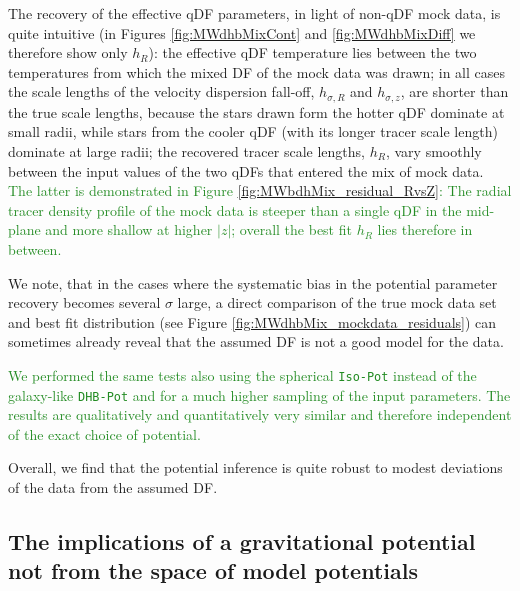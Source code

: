 \documentclass[iop,revtex4]{emulateapj}
\newcommand{\NEW}[1]{\textcolor{ForestGreen}{#1}}
\newcommand{\OLD}[1]{}
\begin{document}
The recovery of the effective qDF parameters, in light of non-qDF mock data, is quite intuitive (in Figures \ref{fig:MWdhbMixCont} and \ref{fig:MWdhbMixDiff} we therefore show only $h_R$): the effective qDF temperature lies between the two temperatures from which the mixed DF of the mock data was drawn; in all cases the scale lengths of the velocity dispersion fall-off, $h_{\sigma,R}$ and $h_{\sigma,z}$, are shorter than the true scale lengths, because the stars drawn form the hotter qDF dominate at small radii, while stars from the cooler qDF (with its longer tracer scale length) dominate at large radii; the recovered tracer scale lengths, $h_R$, vary smoothly between the input values of the two qDFs that entered the mix of mock data\OLD{, with again the impact of contamination by a hotter qDF (with its shorter scale length in this case) being more important}. \NEW{The latter is demonstrated in Figure \ref{fig:MWbdhMix_residual_RvsZ}: The radial tracer density profile of the mock data is steeper than a single qDF in the mid-plane and more shallow at higher $|z|$; overall the best fit $h_R$ lies therefore in between.}

We note, that in the cases where the systematic bias in the potential parameter recovery becomes several $\sigma$ large, a direct comparison of the true mock data set and best fit distribution (see Figure \ref{fig:MWdhbMix_mockdata_residuals}) can sometimes already reveal that the assumed DF is not a good model for the data.

\NEW{We performed the same tests also using the spherical \texttt{Iso-Pot} instead of the galaxy-like \texttt{DHB-Pot} and for a much higher sampling of the input parameters. The results are qualitatively and quantitatively very similar and therefore independent of the exact choice of potential.}

Overall, we find that the potential inference is quite robust to modest deviations of the data from the assumed DF. 

\subsection{The implications of a gravitational potential not from the space of model potentials} \label{sec:results_potential}
\end{document}
